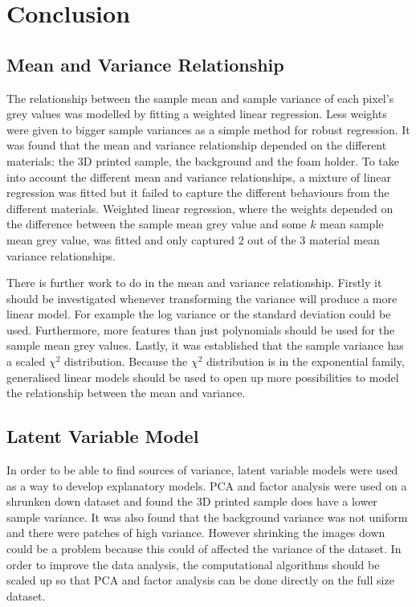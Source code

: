\documentclass[12pt]{report}
\begin{document}
\chapter{Conclusion}

\section{Mean and Variance Relationship}
The relationship between the sample mean and sample variance of each pixel's grey values was modelled by fitting a weighted linear regression. Less weights were given to bigger sample variances as a simple method for robust regression. It was found that the mean and variance relationship depended on the different materials: the 3D printed sample, the background and the foam holder. To take into account the different mean and variance relationships, a mixture of linear regression was fitted but it failed to capture the different behaviours from the different materials. Weighted linear regression, where the weights depended on the difference between the sample mean grey value and some $k$ mean sample mean grey value, was fitted and only captured 2 out of the 3 material mean variance relationships.

There is further work to do in the mean and variance relationship. Firstly it should be investigated whenever transforming the variance will produce a more linear model. For example the log variance or the standard deviation could be used. Furthermore, more features than just polynomials should be used for the sample mean grey values. Lastly, it was established that the sample variance has a scaled $\chi^2$ distribution. Because the $\chi^2$ distribution is in the exponential family, generalised linear models \cite{mccullagh1989generalized} should be used to open up more possibilities to model the relationship between the mean and variance.

\section{Latent Variable Model}
In order to be able to find sources of variance, latent variable models were used as a way to develop explanatory models. PCA and factor analysis were used on a shrunken down dataset and found the 3D printed sample does have a lower sample variance. It was also found that the background variance was not uniform and there were patches of high variance. However shrinking the images down could be a problem because this could of affected the variance of the dataset. In order to improve the data analysis, the computational algorithms should be scaled up so that PCA and factor analysis can be done directly on the full size dataset.
\end{document}
